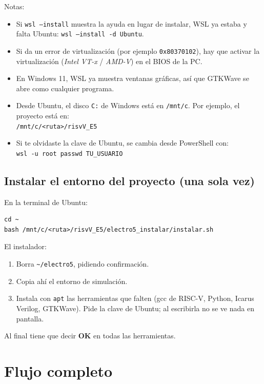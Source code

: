 \documentclass[11pt,a4paper]{article}
\newcommand{\code}[1]{\texttt{#1}}
\begin{document}
Notas:
\begin{itemize}
\item Si \code{wsl --install} muestra la ayuda en lugar de instalar, WSL ya estaba y falta Ubuntu: \code{wsl --install -d Ubuntu}.
\item Si da un error de virtualización (por ejemplo \code{0x80370102}), hay que activar la virtualización (\emph{Intel VT-x} / \emph{AMD-V}) en el BIOS de la PC.
\item En Windows 11, WSL ya muestra ventanas gráficas, así que GTKWave se abre como cualquier programa.
\item Desde Ubuntu, el disco \code{C:} de Windows está en \code{/mnt/c}. Por ejemplo, el proyecto está en:\\ \code{/mnt/c/<ruta>/risvV\_E5}
\item Si te olvidaste la clave de Ubuntu, se cambia desde PowerShell con:\\ \code{wsl -u root passwd TU\_USUARIO}
\end{itemize}

\subsection{Instalar el entorno del proyecto (una sola vez)}\label{sec:wsl}

En la terminal de Ubuntu:
\begin{lstlisting}
cd ~
bash /mnt/c/<ruta>/risvV_E5/electro5_instalar/instalar.sh
\end{lstlisting}
El instalador:
\begin{enumerate}
\item Borra \code{\textasciitilde/electro5}, pidiendo confirmación.
\item Copia ahí el entorno de simulación.
\item Instala con \code{apt} las herramientas que falten (gcc de RISC-V, Python, Icarus Verilog, GTKWave). Pide la clave de Ubuntu; al escribirla no se ve nada en pantalla.
\end{enumerate}
Al final tiene que decir \textbf{OK} en todas las herramientas.

\section{Flujo completo}
\end{document}
